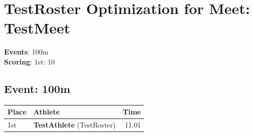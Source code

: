 \documentclass[11pt]{article}
\begin{document}
\section*{TestRoster Optimization for Meet: TestMeet}

\textbf{Events}: 100m\\

\noindent\textbf{Scoring}: 1st: 10\\

\subsection*{Event: 100m}
\begin{tabularx}{\linewidth}{lXr}
\toprule
Place & Athlete & Time \\
\midrule
1st & \textbf{TestAthlete} (TestRoster) & 11.01 \\
\bottomrule
\end{tabularx}
\end{document}
